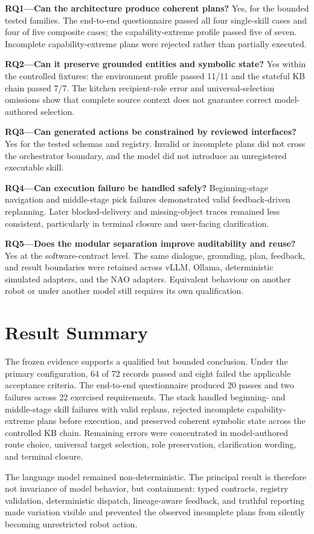 \textbf{RQ1---Can the architecture produce coherent plans?}
Yes, for the bounded tested families. The end-to-end questionnaire passed all four single-skill cases and four of five composite cases; the capability-extreme profile passed five of seven. Incomplete capability-extreme plans were rejected rather than partially executed.

\textbf{RQ2---Can it preserve grounded entities and symbolic state?}
Yes within the controlled fixtures: the environment profile passed 11/11 and the stateful KB chain passed 7/7. The kitchen recipient-role error and universal-selection omissions show that complete source context does not guarantee correct model-authored selection.

\textbf{RQ3---Can generated actions be constrained by reviewed interfaces?}
Yes for the tested schemas and registry. Invalid or incomplete plans did not cross the orchestrator boundary, and the model did not introduce an unregistered executable skill.

\textbf{RQ4---Can execution failure be handled safely?}
Beginning-stage navigation and middle-stage pick failures demonstrated valid feedback-driven replanning. Later blocked-delivery and missing-object traces remained less consistent, particularly in terminal closure and user-facing clarification.

\textbf{RQ5---Does the modular separation improve auditability and reuse?}
Yes at the software-contract level. The same dialogue, grounding, plan, feedback, and result boundaries were retained across vLLM, Ollama, deterministic simulated adapters, and the NAO adapters. Equivalent behaviour on another robot or under another model still requires its own qualification.

\section{Result Summary}

The frozen evidence supports a qualified but bounded conclusion. Under the primary configuration, 64 of 72 records passed and eight failed the applicable acceptance criteria. The end-to-end questionnaire produced 20 passes and two failures across 22 exercised requirements. The stack handled beginning- and middle-stage skill failures with valid replans, rejected incomplete capability-extreme plans before execution, and preserved coherent symbolic state across the controlled KB chain. Remaining errors were concentrated in model-authored route choice, universal target selection, role preservation, clarification wording, and terminal closure.

The language model remained non-deterministic. The principal result is therefore not invariance of model behavior, but containment: typed contracts, registry validation, deterministic dispatch, lineage-aware feedback, and truthful reporting made variation visible and prevented the observed incomplete plans from silently becoming unrestricted robot action.
